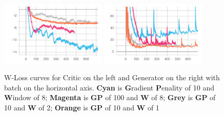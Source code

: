 \documentclass{article}
\begin{document}
\begin{figure}
    \centering
    \includegraphics[width=0.45\textwidth]{Loss_train_crit_collapse}
     \includegraphics[width=0.45\textwidth]{Loss_train_gen_collapse}\\
    \caption{W-Loss curves for Critic on the left and Generator on the right with batch on the horizontal axis. \textbf{Cyan} is \textbf{G}radient \textbf{P}enality of 10 and \textbf{W}indow of 8; \textbf{Magenta} is \textbf{GP} of 100 and \textbf{W} of 8; \textbf{Grey} is \textbf{GP} of 10 and \textbf{W} of 2; \textbf{Orange} is \textbf{GP} of 10 and \textbf{W} of 1 }
    \label{sample_mode_collapse}
\end{figure}
\end{document}
